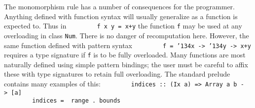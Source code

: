 The monomorphism rule has a number of consequences for the programmer.
Anything defined with function syntax will usually
generalize as a function is expected to.  Thus in
\bprog
\mbox{\tt \ \ \ \ \ \ \ \ f\ x\ y\ =\ x+y}
\eprog
the function \mbox{\tt f} may be used at any overloading in class \mbox{\tt Num}.
There is no danger of recomputation here.  However, the same function
defined with pattern syntax
\bprog
\mbox{\tt \ \ \ \ \ \ \ \ f\ =\ {\char'134}x\ ->\ {\char'134}y\ ->\ x+y}
\eprog
requires a type signature if \mbox{\tt f} is to be fully overloaded.
Many functions are most naturally defined using simple pattern
bindings; the user must be careful to affix these with type signatures
to retain full overloading.  The standard prelude contains many
examples of this:
\bprog
\mbox{\tt \ \ \ \ \ \ \ \ indices\ ::\ (Ix\ a)\ =>\ Array\ a\ b\ ->\ [a]}\\
\mbox{\tt \ \ \ \ \ \ \ \ indices\ =\ \ range\ .\ bounds}
\eprog

% 
% 
% 

